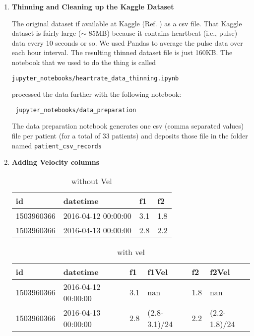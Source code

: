 \documentclass[12pt]{article}
\begin{document}
\begin{enumerate}

\item {\bf Thinning and Cleaning up the Kaggle Dataset}

The original dataset if available at Kaggle (Ref. \cite{kaggle-fitbit}) as a csv file. That
Kaggle dataset is fairly large ($\sim$ 85MB)
because it contains heartbeat (i.e., pulse) data every 10 seconds or so. We used Pandas to average the pulse data over each hour interval.  The resulting thinned dataset file
is just 160KB. The notebook that we used to do the thing is called

 \centerline{{\tt jupyter\_notebooks/heartrate\_data\_thinning.ipynb}}
 
 processed the data further with the following notebook:

\centerline{{\tt
 jupyter\_notebooks/data\_preparation}}
 
 The data preparation notebook generates one 
 csv (comma separated values) file per patient (for a total of 33 patients) and
 deposits those file in the folder named 
 {\tt patient\_csv\_records} 


\item {\bf Adding Velocity columns}
\begin{table}[h!]
\centering
\begin{tabular}{|l|l|l|l|}
\hline
\rowcolor[HTML]{FFFFC7} 
id & datetime & f1 & f2 \\ \hline
1503960366 & 2016-04-12 00:00:00 & 3.1 & 1.8 \\ \hline
1503960366 & 2016-04-13 00:00:00 & 2.8 & 2.2 \\ \hline
\end{tabular}
\caption{without Vel}
\label{tab-cfitbit-without-vel}
\end{table}


\begin{table}[h!]
\centering
\begin{tabular}{|l|l|l|l|l|l|}
\hline
\rowcolor[HTML]{FFFFC7} 
id & datetime & f1 & f1Vel & f2 & f2Vel \\ \hline
1503960366 & 2016-04-12 00:00:00 & 3.1 & nan & 1.8 & nan \\ \hline
1503960366 & 2016-04-13 00:00:00 & 2.8 & (2.8-3.1)/24 & 2.2 & (2.2-1.8)/24 \\ \hline
\end{tabular}
\caption{with vel}
\label{tab-cfitbit-with-vel}
\end{table}


\end{enumerate}
\end{document}
